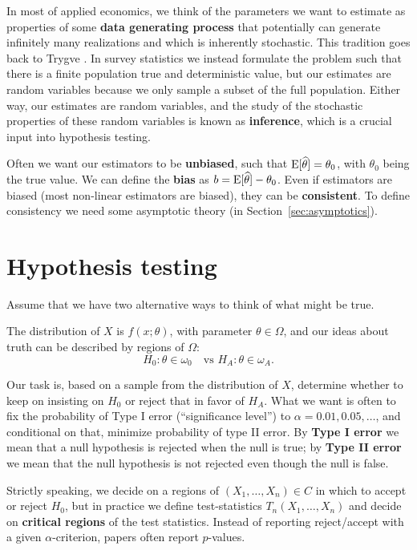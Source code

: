 \documentclass[10pt]{article}
\begin{document}
In most of applied economics, we think of the parameters we want to estimate as properties
of some \textbf{data generating process} that potentially can generate infinitely many realizations and
which is inherently stochastic. This tradition goes back to Trygve \citet{Haavelmo1944}.
In survey statistics we instead formulate the problem such that there is a finite population true and
deterministic value, but our estimates are random variables because we only sample a subset of the
full population. Either way, our estimates are random variables, and the study of the stochastic
properties of these random variables is known as \textbf{inference}, which is a crucial input
into hypothesis testing. 

Often we want our estimators to be \textbf{unbiased}, such that
$\operatorname{E}[\widehat{\theta}]=\theta_0$, with $\theta_0$ being the true value. We can
define the \textbf{bias} as $b=\operatorname{E}[\widehat{\theta}] -\theta_0$. Even if
estimators are biased (most non-linear estimators are biased), they can be
\textbf{consistent}. To define consistency we need some asymptotic theory (in
Section~\ref{sec:asymptotics}).

\section{Hypothesis testing}
Assume that we have two alternative ways to think of what might
be true.

The distribution of $X$ is $f(x;\theta)$, with parameter
$\theta\in\Omega$, and our ideas about truth can be described by
regions of $\Omega$:
\[ H_0: \theta\in\omega_0 \quad \text{vs $H_{\!A}: \theta\in\omega_A$.}
\]

Our task is, based on a sample from the distribution of $X$, determine
whether to keep on insisting on $H_0$ or reject that in favor of
$H_{\!A}$. What we want is often to fix the probability of Type I error
(``significance level'') to $\alpha=0.01,0.05,\dots$, and conditional
on that, minimize probability of type II error. By \textbf{Type I error} we mean that
a null hypothesis is rejected when the null is true; by \textbf{Type II error} we mean
that the null hypothesis is not rejected even though the null is false.

Strictly speaking, we decide on a regions of $(X_1,\dots,X_n)\in C$ in which to
accept or reject $H_0$, but in practice we define test-statistics
$T_n(X_1,\dots,X_n)$ and decide on \textbf{critical regions} of the test statistics. Instead of
reporting reject/accept with a given $\alpha$-criterion, papers often report
$p$-values. 
\end{document}
